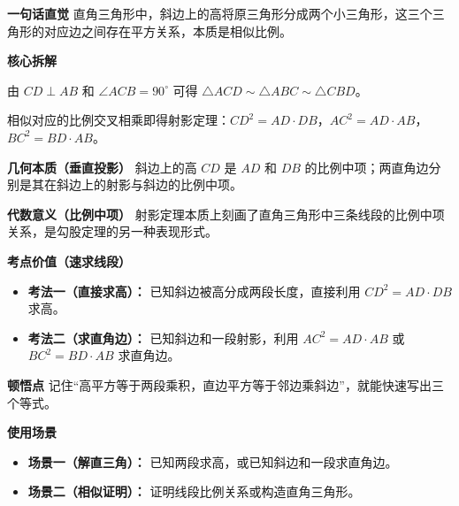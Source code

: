 \begin{explanationbox}
	\textbf{\textcolor{CExplanation}{一句话直觉}}
	直角三角形中，斜边上的高将原三角形分成两个小三角形，这三个三角形的对应边之间存在平方关系，本质是相似比例。

	\medskip
	\textbf{\textcolor{CExplanation}{核心拆解}}
	\begin{description}[style=nextline, leftmargin=2.8em, labelsep=0.5em, itemsep=0.45em]
		\item[\textbf{要点一（相似基础）：}]
			由 $CD\perp AB$ 和 $\angle ACB=90^\circ$ 可得 $\triangle ACD\sim\triangle ABC\sim\triangle CBD$。
		\item[\textbf{要点二（比例中项）：}]
			相似对应的比例交叉相乘即得射影定理：$CD^2=AD\cdot DB$，$AC^2=AD\cdot AB$，$BC^2=BD\cdot AB$。
	\end{description}

	\medskip
	\textbf{\textcolor{CExplanation}{几何本质（垂直投影）}}
	斜边上的高 $CD$ 是 $AD$ 和 $DB$ 的比例中项；两直角边分别是其在斜边上的射影与斜边的比例中项。

	\medskip
	\textbf{\textcolor{CExplanation}{代数意义（比例中项）}}
	射影定理本质上刻画了直角三角形中三条线段的比例中项关系，是勾股定理的另一种表现形式。

	\medskip
	\textbf{\textcolor{CExplanation}{考点价值（速求线段）}}
	\begin{itemize}[leftmargin=*, itemsep=0.5em, topsep=0.4em]
		\item \textbf{考法一（直接求高）：} 已知斜边被高分成两段长度，直接利用 $CD^2 = AD\cdot DB$ 求高。
		\item \textbf{考法二（求直角边）：} 已知斜边和一段射影，利用 $AC^2 = AD\cdot AB$ 或 $BC^2 = BD\cdot AB$ 求直角边。
	\end{itemize}

	\medskip
	\textbf{\textcolor{CExplanation}{顿悟点}}
	记住“高平方等于两段乘积，直边平方等于邻边乘斜边”，就能快速写出三个等式。

	\medskip
	\textbf{\textcolor{CExplanation}{使用场景}}
	\begin{itemize}[leftmargin=*, itemsep=0.5em, topsep=0.4em]
		\item \textbf{场景一（解直三角）：} 已知两段求高，或已知斜边和一段求直角边。
		\item \textbf{场景二（相似证明）：} 证明线段比例关系或构造直角三角形。
	\end{itemize}

\end{explanationbox}
